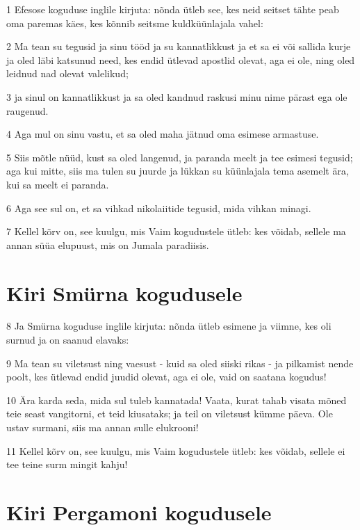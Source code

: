 \par 1 Efesose koguduse inglile kirjuta: nõnda ütleb see, kes neid seitset tähte peab oma paremas käes, kes kõnnib seitsme kuldküünlajala vahel:
\par 2 Ma tean su tegusid ja sinu tööd ja su kannatlikkust ja et sa ei või sallida kurje ja oled läbi katsunud need, kes endid ütlevad apostlid olevat, aga ei ole, ning oled leidnud nad olevat valelikud;
\par 3 ja sinul on kannatlikkust ja sa oled kandnud raskusi minu nime pärast ega ole raugenud.
\par 4 Aga mul on sinu vastu, et sa oled maha jätnud oma esimese armastuse.
\par 5 Siis mõtle nüüd, kust sa oled langenud, ja paranda meelt ja tee esimesi tegusid; aga kui mitte, siis ma tulen su juurde ja lükkan su küünlajala tema asemelt ära, kui sa meelt ei paranda.
\par 6 Aga see sul on, et sa vihkad nikolaiitide tegusid, mida vihkan minagi.
\par 7 Kellel kõrv on, see kuulgu, mis Vaim kogudustele ütleb: kes võidab, sellele ma annan süüa elupuust, mis on Jumala paradiisis.

\section*{Kiri Smürna kogudusele}

\par 8 Ja Smürna koguduse inglile kirjuta: nõnda ütleb esimene ja viimne, kes oli surnud ja on saanud elavaks:
\par 9 Ma tean su viletsust ning vaesust - kuid sa oled siiski rikas - ja pilkamist nende poolt, kes ütlevad endid juudid olevat, aga ei ole, vaid on saatana kogudus!
\par 10 Ära karda seda, mida sul tuleb kannatada! Vaata, kurat tahab visata mõned teie seast vangitorni, et teid kiusataks; ja teil on viletsust kümme päeva. Ole ustav surmani, siis ma annan sulle elukrooni!
\par 11 Kellel kõrv on, see kuulgu, mis Vaim kogudustele ütleb: kes võidab, sellele ei tee teine surm mingit kahju!

\section*{Kiri Pergamoni kogudusele}

